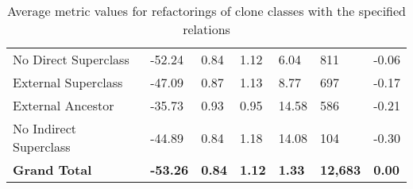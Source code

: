 \begin{appendices}
\begin{table}[H]
{\begin{tabular}{@{}lllllll@{}}
\hspace{10pt} No Direct Superclass & -52.24 & 0.84 & 1.12 & 6.04 & 811 & -0.06 \\
\hspace{10pt} External Superclass & -47.09 & 0.87 & 1.13 & 8.77 & 697 & -0.17 \\
\hspace{10pt} External Ancestor & -35.73 & 0.93 & 0.95 & 14.58 & 586 & -0.21 \\
\hspace{10pt} No Indirect Superclass & -44.89 & 0.84 & 1.18 & 14.08 & 104 & -0.30 \\ \midrule
\textbf{Grand Total} & \textbf{-53.26} & \textbf{0.84} & \textbf{1.12} & \textbf{1.33} & \textbf{12,683} & \textbf{0.00} \\ \bottomrule
\end{tabular}%
}
\caption{Average metric values for refactorings of clone classes with the specified relations}
\label{tab:full-relation}
\end{table}

\end{appendices}
